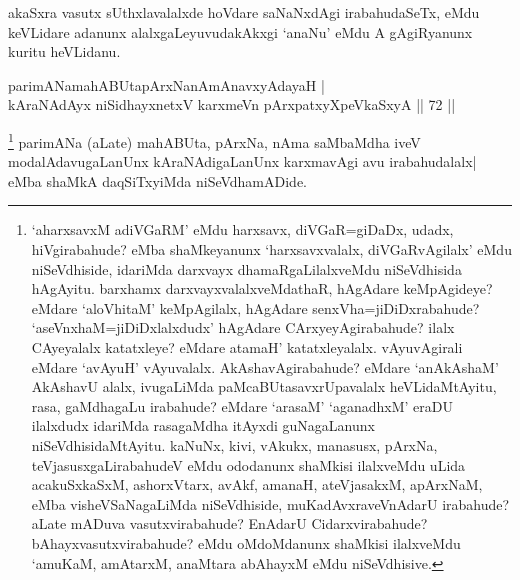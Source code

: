 \begin{artha}
akaSxra vasutx sUthxlavalalxde hoVdare saNaNxdAgi irabahudaSeTx, eMdu keVLidare adanunx alalxgaLeyuvudakAkxgi `anaNu' eMdu A gAgiRyanunx kuritu heVLidanu.
\end{artha}


\begin{shl}
parimANamahABUtapArxNanAmAnavxyAdayaH |\\
kAraNAdAyx niSidhayxnetxV karxmeVn pArxpatxyXpeVkaSxyA \hfill || 72 ||
\end{shl}

\begin{artha}
\footnote[1]{`aharxsavxM adiVGaRM' eMdu harxsavx, diVGaR=giDaDx, udadx, hiVgirabahude? eMba shaMkeyanunx `harxsavxvalalx, diVGaRvAgilalx' eMdu niSeVdhiside, idariMda darxvayx dhamaRgaLilalxveMdu niSeVdhisida hAgAyitu. barxhamx darxvayxvalalxveMdathaR, hAgAdare keMpAgideye? eMdare `aloVhitaM' keMpAgilalx, hAgAdare senxVha=jiDiDxrabahude? `aseVnxhaM=jiDiDxlalxdudx' hAgAdare CArxyeyAgirabahude? ilalx CAyeyalalx katatxleye? eMdare atamaH' katatxleyalalx. vAyuvAgirali eMdare `avAyuH' vAyuvalalx. AkAshavAgirabahude? eMdare `anAkAshaM' AkAshavU alalx, ivugaLiMda paMcaBUtasavxrUpavalalx heVLidaMtAyitu, rasa, gaMdhagaLu irabahude? eMdare `arasaM' `aganadhxM' eraDU ilalxdudx idariMda rasagaMdha itAyxdi guNagaLanunx niSeVdhisidaMtAyitu. kaNuNx, kivi, vAkukx, manasusx, pArxNa, teVjasusxgaLirabahudeV eMdu ododanunx shaMkisi ilalxveMdu uLida acakuSxkaSxM, ashorxVtarx, avAkf, amanaH, ateVjasakxM, apArxNaM, eMba visheVSaNagaLiMda niSeVdhiside, muKadAvxraveVnAdarU irabahude? aLate mADuva vasutxvirabahude? EnAdarU Cidarxvirabahude? bAhayxvasutxvirabahude? eMdu oMdoMdanunx shaMkisi ilalxveMdu `amuKaM, amAtarxM, anaMtara abAhayxM eMdu niSeVdhisive.} parimANa (aLate) mahABUta, pArxNa, nAma saMbaMdha iveV modalAdavugaLanUnx kAraNAdigaLanUnx karxmavAgi avu irabahudalalx| eMba shaMkA daqSiTxyiMda niSeVdhamADide.
\end{artha}



